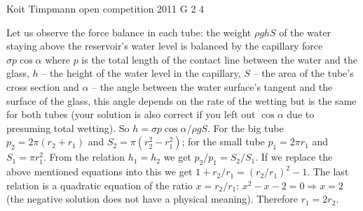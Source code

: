 \documentclass[11pt]{article}
\begin{document}
{Koit Timpmann} %
{open competition} %
{2011} %
{G 2} %
{4} %
{

\ifEngSolution
Let us observe the force balance in each tube: the weight $\rho g h S$ of the water staying above the reservoir’s water level is balanced by the capillary force $\sigma p \cos \alpha$ where $p$ is the total length of the contact line between the water and the glass, $h$ – the height of the water level in the capillary, $S$ – the area of the tube’s cross section and $\alpha$ – the angle between the water surface’s tangent and the surface of the glass, this angle depends on the rate of the wetting but is the same for both tubes (your solution is also correct if you left out $\cos\alpha$ due to presuming total wetting). So $h=\sigma p
\cos\alpha/\rho g S$. For the big tube $p_2=2\pi (r_2+r_1)$ and $S_2=\pi(r_2^2-r_1^2)$; for the small tube $p_1=2\pi r_1$ and $S_1=\pi
r_1^2$. From the relation $h_1=h_2$ we get $p_2/p_1=S_2/S_1$. If we replace the above mentioned equations into this we get $1+r_2/r_1=(r_2/r_1)^2-1$. The last relation is a quadratic equation of the ratio $x=r_2/r_1$: $x^2-x-2=0 \Rightarrow x=2$ (the negative solution does not have a physical meaning). Therefore $r_1=2 r_2$.
\fi
}
\end{document}
